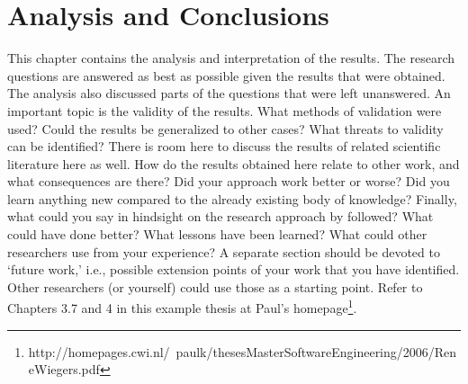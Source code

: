 \chapter{Analysis and Conclusions}
This chapter contains the analysis and interpretation of the results. The
research questions are answered as best as possible given the results that were
obtained. The analysis also discussed parts of the questions that were left
unanswered.
An important topic is the validity of the results. What methods of validation
were used? Could the results be generalized to other cases? What threats to
validity can be identified? There is room here to discuss the results of
related scientific literature here as well. How do the results obtained here
relate to other work, and what consequences are there? Did your approach work
better or worse? Did you learn anything new compared to the already existing
body of knowledge? Finally, what could you say in hindsight on the research
approach by followed? What could have done better? What lessons have been
learned? What could other researchers use from your experience? A separate
section should be devoted to ‘future work,’ i.e., possible extension points of
your work that you have identified. Other researchers (or yourself) could use
those as a starting point.
Refer to Chapters 3.7 and 4 in this example thesis at Paul’s
homepage\footnote{http://homepages.cwi.nl/~paulk/thesesMasterSoftwareEngineering/2006/ReneWiegers.pdf}.
